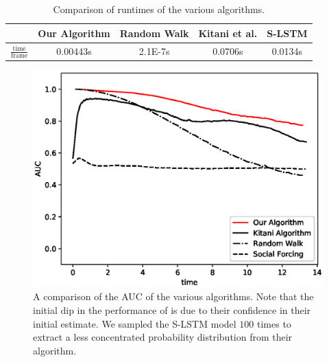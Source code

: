 \documentclass[letterpaper,10pt,conference]{ieeeconf}
\begin{document}
\begin{table}
	\begin{center}
		\caption{Comparison of runtimes of the various algorithms.}
		\label{tab:time}
		\renewcommand{\arraystretch}{1.5}%
		\begin{tabular}{||c | c c  c c ||} 
			\hline
			& Our Algorithm & Random Walk & Kitani et al. & S-LSTM \\ [0.5ex] 
			\hline 
			$\frac{\mathrm{time}}{\mathrm{frame}}$ & 0.00443s & 2.1E-7s & 0.0706s & 0.0134s \\
			\hline
		\end{tabular}
	\end{center}
	\vspace*{-0.6cm}
\end{table}

\begin{figure}
	\centering
	\includegraphics[width=0.9\linewidth]{./figures/the_results.eps}
	\caption{A comparison of the AUC of the various algorithms. Note that the initial dip in the performance of \cite{Kitani2012} is due to their confidence in their initial estimate. We sampled the S-LSTM \cite{Alahi2016} model $100$ times to extract a less concentrated probability distribution from their algorithm.}
	\label{fig:auc_vs_time}
	\vspace*{-0.75cm}
\end{figure}
\end{document}
